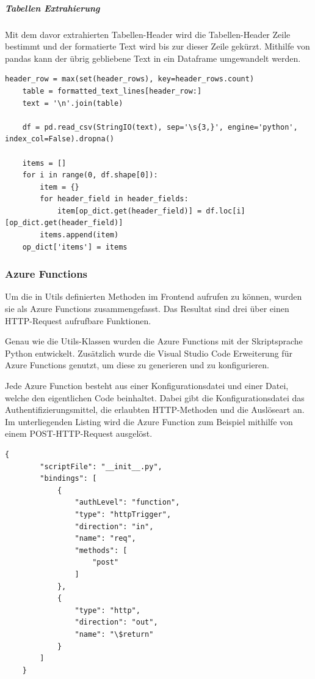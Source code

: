 \subparagraph{Tabellen Extrahierung}

Mit dem davor extrahierten Tabellen-Header wird die Tabellen-Header Zeile bestimmt und der formatierte Text wird bis zur dieser Zeile gekürzt. Mithilfe von pandas kann der übrig gebliebene Text in ein Dataframe umgewandelt werden. 

\begin{minipage}{\linewidth}
\begin{lstlisting}[caption={Tabellen Extrahierung}]
    header_row = max(set(header_rows), key=header_rows.count)
    table = formatted_text_lines[header_row:]
    text = '\n'.join(table)

    df = pd.read_csv(StringIO(text), sep='\s{3,}', engine='python', index_col=False).dropna()
    
    items = []
    for i in range(0, df.shape[0]):
        item = {}
        for header_field in header_fields:
            item[op_dict.get(header_field)] = df.loc[i][op_dict.get(header_field)]
        items.append(item)
    op_dict['items'] = items
\end{lstlisting}
\end{minipage}

\subsubsection{Azure Functions}

Um die in Utils definierten Methoden im Frontend aufrufen zu können, wurden sie als Azure Functions zusammengefasst. Das Resultat sind drei über einen HTTP-Request aufrufbare Funktionen.

Genau wie die Utils-Klassen wurden die Azure Functions mit der Skriptsprache Python entwickelt. Zusätzlich wurde die Visual Studio Code Erweiterung für Azure Functions genutzt, um diese zu generieren und zu konfigurieren.

Jede Azure Function besteht aus einer Konfigurationsdatei und einer Datei, welche den eigentlichen Code beinhaltet. Dabei gibt die Konfigurationsdatei das Authentifizierungsmittel, die erlaubten HTTP-Methoden und die Auslöseart an. Im unterliegenden Listing wird die Azure Function zum Beispiel mithilfe von einem POST-HTTP-Request ausgelöst.

\begin{lstlisting}[caption={Beispiel fuer eine Konfigurationsdatei}]
    {
        "scriptFile": "__init__.py",
        "bindings": [
            {
                "authLevel": "function",
                "type": "httpTrigger",
                "direction": "in",
                "name": "req",
                "methods": [
                    "post"
                ]
            },
            {
                "type": "http",
                "direction": "out",
                "name": "\$return"
            }
        ]
    }
\end{lstlisting}

